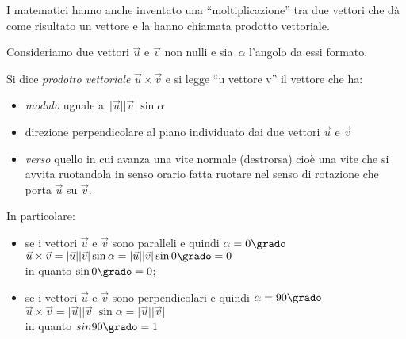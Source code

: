 I matematici hanno anche inventato una ``moltiplicazione'' tra due vettori che
dà come risultato un vettore e la hanno chiamata prodotto vettoriale.


\begin{inaccessibleblock}
 \begin{center}
  \scalebox{.8}{}
 \end{center}
\end{inaccessibleblock}


Consideriamo due vettori \(\vec{u}\) e \(\vec{v}\) non nulli e 
sia~\(\alpha\) l'angolo da essi formato.

\begin{definizione}
 Si dice \emph{prodotto vettoriale} \(\vec{u} \times \vec{v}\)
 e si legge ``u vettore v'' il vettore che ha: 
 \begin{itemize} [noitemsep]
  \item \emph{modulo} uguale 
   a~\(\lvert\vec{u}\rvert\lvert\vec{v}\rvert \sin \alpha\)
  \item direzione perpendicolare al piano individuato dai due 
   vettori \(\vec{u}\) e \(\vec{v}\)
  \item \emph{verso} quello in cui avanza una vite normale (destrorsa) 
   cioè una vite che si avvita ruotandola in senso orario
   fatta ruotare nel senso di rotazione che porta \(\vec{u}\) su \(\vec{v}\).
 \end{itemize}
\end{definizione}
 
In particolare:
\begin{itemize} [noitemsep]
 \item se i vettori \(\vec{u}\) e \(\vec{v}\) sono paralleli e 
  quindi \(\alpha=0\grado\)
  \(\vec{u} \times \vec{v} = 
    \lvert\vec{u}\rvert\lvert\vec{v}\rvert \sin \alpha=
    \lvert\vec{u}\rvert\lvert\vec{v}\rvert \sin 0\grado=0\) \\
  in quanto \(\sin 0\grado = 0\);
 \item se i vettori \(\vec{u}\) e \(\vec{v}\) sono perpendicolari e 
  quindi \(\alpha=90\grado\)
  \(\vec{u} \times \vec{v} = 
    \lvert\vec{u}\rvert\lvert\vec{v}\rvert \sin \alpha=
    \lvert\vec{u}\rvert\lvert\vec{v}\rvert\)\\
  in quanto \(sin 90\grado = 1\)
\end{itemize}

